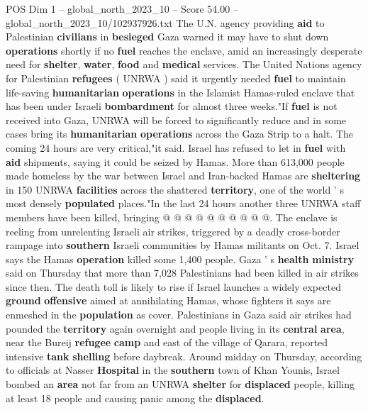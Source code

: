 \begin{textsample}{POS Dim 1 – global\_north\_2023\_10 – Score 54.00 – global\_north\_2023\_10/102937926.txt}  \label{ex:f1_pos_311}
The U.N. agency providing \textbf{aid} to Palestinian \textbf{civilians} in \textbf{besieged} Gaza warned it may have to shut down \textbf{operations} shortly if no \textbf{fuel} reaches the enclave, amid an increasingly desperate need for \textbf{shelter}, \textbf{water}, \textbf{food} and \textbf{medical} services.
The United Nations agency for Palestinian \textbf{refugees} ( UNRWA ) said it urgently needed \textbf{fuel} to maintain life-saving \textbf{humanitarian} \textbf{operations} in the Islamist Hamas-ruled enclave that has been under Israeli \textbf{bombardment} for almost three weeks."If \textbf{fuel} is not received into Gaza, UNRWA will be forced to significantly reduce and in some cases bring its \textbf{humanitarian} \textbf{operations} across the Gaza Strip to a halt.
The coming 24 hours are very critical,"it said.
Israel has refused to let in \textbf{fuel} with \textbf{aid} shipments, saying it could be seized by Hamas.
More than 613,000 people made homeless by the war between Israel and Iran-backed Hamas are \textbf{sheltering} in 150 UNRWA \textbf{facilities} across the shattered \textbf{territory}, one of the world ' s most densely \textbf{populated} places."In the last 24 hours another three UNRWA staff members have been killed, bringing @ @ @ @ @ @ @ @ @ @.
The enclave is reeling from unrelenting Israeli air strikes, triggered by a deadly cross-border rampage into \textbf{southern} Israeli communities by Hamas militants on Oct. 7.
Israel says the Hamas \textbf{operation} killed some 1,400 people.
Gaza ' s \textbf{health} \textbf{ministry} said on Thursday that more than 7,028 Palestinians had been killed in air strikes since then.
The death toll is likely to rise if Israel launches a widely expected \textbf{ground} \textbf{offensive} aimed at annihilating Hamas, whose fighters it says are enmeshed in the \textbf{population} as cover.
Palestinians in Gaza said air strikes had pounded the \textbf{territory} again overnight and people living in its \textbf{central} \textbf{area}, near the Bureij \textbf{refugee} \textbf{camp} and east of the village of Qarara, reported intensive \textbf{tank} \textbf{shelling} before daybreak.
Around midday on Thursday, according to officials at Nasser \textbf{Hospital} in the \textbf{southern} town of Khan Younis, Israel bombed an \textbf{area} not far from an UNRWA \textbf{shelter} for \textbf{displaced} people, killing at least 18 people and causing panic among the \textbf{displaced}.

\end{textsample}
